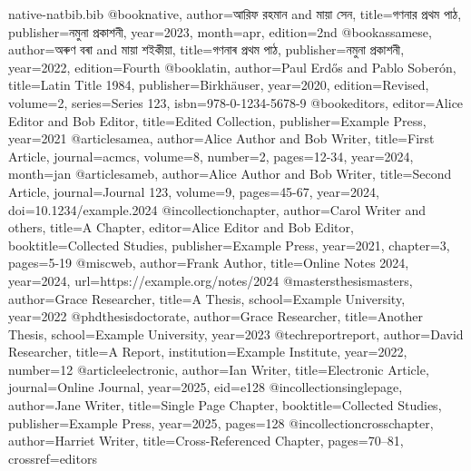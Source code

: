 \begin{filecontents*}{native-natbib.bib}
@book{native,
 author={আরিফ রহমান and মায়া সেন}, title={গণনার প্রথম পাঠ},
 publisher={নমুনা প্রকাশনী}, year={2023}, month=apr, edition={2nd}}
@book{assamese,
 author={অৰুণ বৰা and মায়া শইকীয়া}, title={গণনাৰ প্ৰথম পাঠ},
 publisher={নমুনা প্ৰকাশনী}, year={2022}, edition={Fourth}}
@book{latin,
 author={Paul Erd{\H{o}}s and Pablo Soberón}, title={Latin Title 1984},
 publisher={Birkhäuser}, year={2020}, edition={Revised},
 volume={2}, series={Series 123}, isbn={978-0-1234-5678-9}}
@book{editors,
 editor={Alice Editor and Bob Editor}, title={Edited Collection},
 publisher={Example Press}, year={2021}}
@article{samea,
 author={Alice Author and Bob Writer}, title={First Article},
 journal=acmcs, volume={8}, number={2}, pages={12-34}, year={2024}, month=jan}
@article{sameb,
 author={Alice Author and Bob Writer}, title={Second Article},
 journal={Journal 123}, volume={9}, pages={45-67}, year={2024},
 doi={10.1234/example.2024}}
@incollection{chapter,
 author={Carol Writer and others}, title={A Chapter},
 editor={Alice Editor and Bob Editor}, booktitle={Collected Studies},
 publisher={Example Press}, year={2021}, chapter={3}, pages={5-19}}
@misc{web,
 author={Frank Author}, title={Online Notes 2024}, year={2024},
 url={https://example.org/notes/2024}}
@mastersthesis{masters,
 author={Grace Researcher}, title={A Thesis}, school={Example University}, year={2022}}
@phdthesis{doctorate,
 author={Grace Researcher}, title={Another Thesis}, school={Example University}, year={2023}}
@techreport{report,
 author={David Researcher}, title={A Report}, institution={Example Institute},
 year={2022}, number={12}}
@article{electronic,
 author={Ian Writer}, title={Electronic Article}, journal={Online Journal},
 year={2025}, eid={e128}}
@incollection{singlepage,
 author={Jane Writer}, title={Single Page Chapter}, booktitle={Collected Studies},
 publisher={Example Press}, year={2025}, pages={128}}
@incollection{crosschapter,
 author={Harriet Writer}, title={Cross-Referenced Chapter}, pages={70--81},
 crossref={editors}}
\end{filecontents*}
